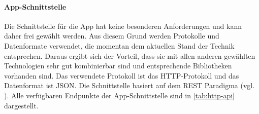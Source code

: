 \FloatBarrier
\paragraph{App-Schnittstelle} \label{par:app-schnittstelle}
Die Schnittstelle für die App hat keine besonderen Anforderungen und kann daher frei gewählt werden.
Aus diesem Grund werden Protokolle und Datenformate verwendet, die momentan dem aktuellen Stand der
Technik entsprechen. 
Daraus ergibt sich der Vorteil, dass sie mit allen anderen gewählten Technologien sehr gut
kombinierbar sind und entsprechende Bibliotheken vorhanden sind.
Das verwendete Protokoll ist das \gls{HTTP}-Protokoll und das Datenformat ist \gls{JSON}.
Die Schnittstelle basiert auf dem \gls{REST} Paradigma (vgl. \cite{Fielding2000}). 
Alle verfügbaren Endpunkte der App-Schnittstelle sind in \autoref{tab:http-api} dargestellt.

